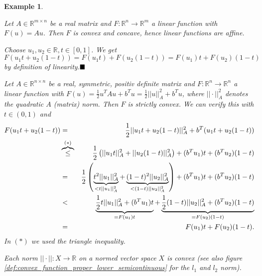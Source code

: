 \documentclass{scrreprt}
\newcommand{\qed}{$\hfill\blacksquare$}
\newtheorem{example}[theorem]{Example}
\newenvironment{proof}[1][Proof]{\begin{trivlist}
\item[\hskip \labelsep {\bfseries #1}]}{\end{trivlist}}
\begin{document}
        \begin{example} %
        \label{ex:convex_function}

            \begin{enumerate}
                \item Let $A \in \mathbb{R}^{m \times n}$ be a real matrix and $F: \mathbb{R}^{n} \longrightarrow \mathbb{R}^{m}$ a linear function with $F(u) = Au$. Then $F$ is convex and concave, hence linear functions are affine.
                    \begin{proof} %
                        Choose $u_{1}, u_{2} \in \mathbb{R}, t \in [0, 1]$. We get
                        $$
                           F(u_{1}t + u_{2}(1 - t)) = F(u_{1}t) + F(u_{2}(1 - t)) = F(u_{1})t + F(u_{2})(1 - t)
                        $$
                        by definition of linearity.\qed
                    \end{proof}
                \item Let $A \in \mathbb{R}^{n \times n}$ be a real, symmetric, positiv definite matrix and $F: \mathbb{R}^{n} \longrightarrow \mathbb{R}^{n}$ a linear function with $F(u) = \frac{1}{2}u^{T}Au + b^{T}u = \frac{1}{2}||u||_{A}^{2} + b^{T}u$, where $||\cdot||_{A}^{2}$ denotes the quadratic $A$ (matrix) norm. Then $F$ is strictly convex. We can verify this with $t \in (0, 1)$ and
                    \begin{eqnarray}
                        F(u_{1}t + u_{2}(1-t)) &=& \frac{1}{2} ||u_{1}t + u_{2}(1-t)||_{A}^{2} + b^{T}(u_{1}t + u_{2}(1-t)) \notag \\
                        &\overbrace{\le}^{(\ast)}& \frac{1}{2} \left(||u_{1}t||_{A}^{2} + ||u_{2}(1-t)||_{A}^{2}\right) + (b^{T}u_{1})t + (b^{T}u_{2})(1-t) \notag \\
                        &=& \frac{1}{2} \left( \underbrace{t^{2}||u_{1}||_{A}^{2}}_{< t||u_{1}||_{A}^{2}} + \underbrace{(1-t)^{2}||u_{2}||_{A}^{2}}_{< (1-t)||u_{2}||_{A}^{2}} \right) + (b^{T}u_{1})t + (b^{T}u_{2})(1-t) \notag \\
                        &<& \underbrace{\frac{1}{2} t||u_{1}||_{A}^{2} + (b^{T}u_{1})t}_{= F(u_{1})t} + \underbrace{\frac{1}{2} (1-t)||u_{2}||_{A}^{2} + (b^{T}u_{2})(1-t)}_{= F(u_{2})(1-t)} \notag \\
                        &=& F(u_{1})t + F(u_{2})(1-t). \notag
                    \end{eqnarray}
                In $(\ast)$ we used the triangle inequality.
                \item Each norm $||\cdot||: X \longrightarrow \mathbb{R}$ on a normed vector space $X$ is convex (see also figure \ref{def:convex_function_proper_lower_semicontinuous} for the $l_{1}$ and $l_{2}$ norm).

\end{enumerate}
\end{example}
\end{document}
